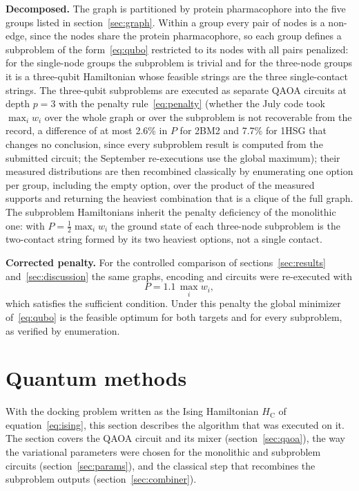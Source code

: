 \documentclass{iopjournal}
\newcommand{\Hc}{H_{\mathrm{C}}}
\begin{document}
\textbf{Decomposed.} The graph is partitioned by protein pharmacophore into the five groups listed in section~\ref{sec:graph}. Within a group every pair of nodes is a non-edge, since the nodes share the protein pharmacophore, so each group defines a subproblem of the form~\eqref{eq:qubo} restricted to its nodes with all pairs penalized: for the single-node groups the subproblem is trivial and for the three-node groups it is a three-qubit Hamiltonian whose feasible strings are the three single-contact strings. The three-qubit subproblems are executed as separate QAOA circuits at depth $p=3$ with the penalty rule~\eqref{eq:penalty} (whether the July code took $\max_i w_i$ over the whole graph or over the subproblem is not recoverable from the record, a difference of at most 2.6\% in $P$ for 2BM2 and 7.7\% for 1HSG that changes no conclusion, since every subproblem result is computed from the submitted circuit; the September re-executions use the global maximum); their measured distributions are then recombined classically by enumerating one option per group, including the empty option, over the product of the measured supports and returning the heaviest combination that is a clique of the full graph. The subproblem Hamiltonians inherit the penalty deficiency of the monolithic one: with $P = \tfrac{1}{2}\max_i w_i$ the ground state of each three-node subproblem is the two-contact string formed by its two heaviest options, not a single contact.

\textbf{Corrected penalty.} For the controlled comparison of sections~\ref{sec:results} and~\ref{sec:discussion} the same graphs, encoding and circuits were re-executed with
\begin{equation}
\label{eq:penalty_corr}
P = 1.1\,\max_i w_i ,
\end{equation}
which satisfies the sufficient condition. Under this penalty the global minimizer of~\eqref{eq:qubo} is the feasible optimum for both targets and for every subproblem, as verified by enumeration.

\section{Quantum methods}
\label{sec:methods}

With the docking problem written as the Ising Hamiltonian $\Hc$ of equation~\eqref{eq:ising}, this section describes the algorithm that was executed on it. The section covers the QAOA circuit and its mixer (section~\ref{sec:qaoa}), the way the variational parameters were chosen for the monolithic and subproblem circuits (section~\ref{sec:params}), and the classical step that recombines the subproblem outputs (section~\ref{sec:combiner}).
\end{document}
